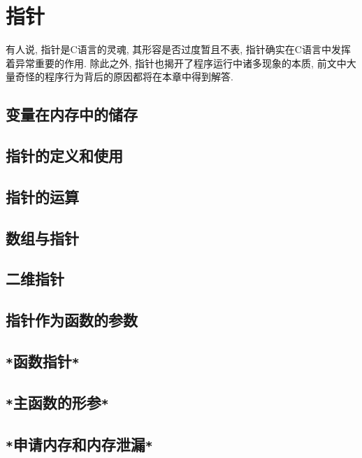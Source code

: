 \chapter{指针} \label{指针}
    有人说, 指针是C语言的灵魂, 其形容是否过度暂且不表, 指针确实在C语言中发挥着异常重要的作用. 除此之外, 指针也揭开了程序运行中诸多现象的本质, 前文中大量奇怪的程序行为背后的原因都将在本章中得到解答.

    \section{变量在内存中的储存}
    \section{指针的定义和使用}
    \section{指针的运算}
    \section{数组与指针}
    \section{二维指针}
    \section{指针作为函数的参数}
    \section{\texttt{*}函数指针\texttt{*}}
    \section{\texttt{*}主函数的形参\texttt{*}}
    \section{\texttt{*}申请内存和内存泄漏\texttt{*}} \label{申请内存和内存泄漏}